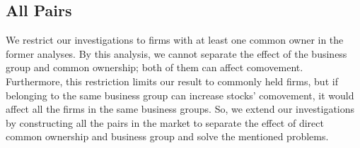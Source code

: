 %						
			
		

				
				
				\FloatBarrier
				
				\subsection{All Pairs}
				
 We restrict our investigations to firms with at least one common owner in the former analyses. By this analysis, we cannot separate the effect of the business group and common ownership; both of them can affect comovement. Furthermore, this restriction limits our result to commonly held firms, but if belonging to the same business group can increase stocks' comovement, it would affect all the firms in the same business groups. 	So, we extend our investigations by constructing all the pairs in the market to separate the effect of direct common ownership and business group and solve the mentioned problems. 
	
